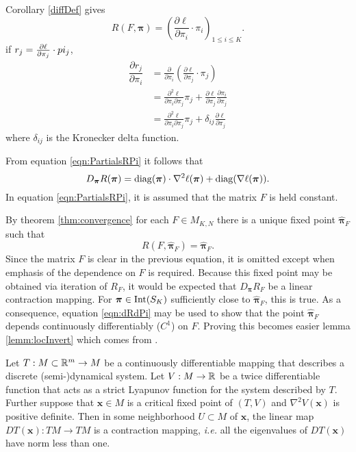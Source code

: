 Corollary \ref{diffDef} gives
\[R(F,\bm\pi)=\left(\frac{\partial\ell}{\partial\pi_i}\cdot\pi_i\right)_{1\leq i\leq K}.\]
if \( r_j = \pdv{\ell}{\pi_j}\cdot pi_j \), 
\begin{align}
	\dfrac{\partial r_j}{\partial \pi_i}&=\frac{\partial}{\partial \pi_i}\left(\frac{\partial\ell}{\partial\pi_j}\cdot\pi_j\right) \nonumber\\
										&=\frac{\partial^2\ell}{\partial \pi_i\partial\pi_j}\pi_j+\frac{\partial\ell}{\partial\pi_j} \frac{\partial\pi_i}{\partial\pi_j} \nonumber\\
										&=\frac{\partial^2\ell}{\partial \pi_i\partial\pi_j}\pi_j+\delta_{ij}\frac{\partial\ell}{\partial\pi_j} \label{eqn:PartialsRPi}
\end{align}
where $\delta_{ij}$ is the Kronecker delta function.

From equation \eqref{eqn:PartialsRPi} it follows that 
\begin{equation}\label{eqn:dRdPi}
D_{\bm\pi}R(\bm\pi)= \operatorname{diag}(\bm\pi)\cdot \nabla^2\ell(\bm\pi)+\operatorname{diag}(\nabla\ell(\bm\pi)).
\end{equation}
In equation \eqref{eqn:PartialsRPi}, it is assumed that the matrix \( F \) is held constant.

By theorem \ref{thm:convergence} for each $F\in M_{K,N}$ there is a unique fixed point $\hat{\bm \pi}_F$ such that 
\begin{equation}\label{pisubF}
R(F,\hat{\bm \pi}_F)=\hat{\bm \pi}_F.
\end{equation}
Since the matrix $F$ is clear in the previous equation, it is omitted except when emphasis of the dependence on $F$ is required. Because this fixed point may be obtained via iteration of \( R_F \), it would be expected that \( D_{\bm\pi}R_F \) be a linear contraction mapping. For \( \bm\pi \in\operatorname{Int}(S_K) \) sufficiently close to \( \hat{\bm \pi}_F \), this is true. As a consequence, equation \eqref{eqn:dRdPi} may be used to show that the point \( \hat{\bm \pi}_F \) depends continuously differentiably (\( C^1 \)) on \( F \). Proving this becomes easier lemma \ref{lemm:locInvert} which comes from \cite{rychlikLyapunov}.

\begin{lemm}\label{lemm:locContract}
	Let \( T:M\subset\mathbb R^m\rightarrow M \) be a continuously differentiable mapping that describes a discrete (semi-)dynamical system. Let \( V:M\rightarrow\mathbb R \) be a twice differentiable function that acts as a strict Lyapunov function for the system described by \( T \). Further suppose that \( \bm x\in M \) is a critical fixed point of \( (T,V) \) and \( \nabla^2V(\bm x) \) is positive definite.  Then in some neighborhood \( U\subset M \) of \( \bm x \), the linear map \( DT(\bm x):TM\rightarrow TM \) is a contraction mapping, \textit{i.e.} all the eigenvalues of \( DT(\bm x) \) have norm less than one.
\end{lemm}

